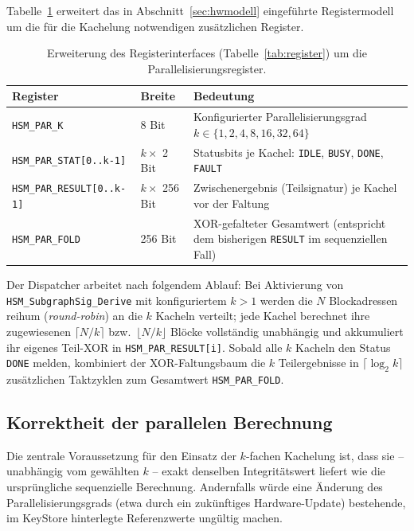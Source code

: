 ﻿\documentclass[a4paper,12pt]{article}
\theoremstyle{definition}
\begin{document}
Tabelle~\ref{tab:par-register} erweitert das in Abschnitt~\ref{sec:hwmodell} eingeführte Registermodell um die für die Kachelung notwendigen zusätzlichen Register.

\begin{table}[h]
	\centering
	\small
	\begin{tabular}{@{}lp{2.6cm}p{8.2cm}@{}}
		\toprule
		Register & Breite & Bedeutung \\
		\midrule
		\texttt{HSM\_PAR\_K} & 8 Bit & Konfigurierter Parallelisierungsgrad $k \in \{1,2,4,8,16,32,64\}$ \\
		\texttt{HSM\_PAR\_STAT[0..k-1]} & $k \times$ 2 Bit & Statusbits je Kachel: \texttt{IDLE}, \texttt{BUSY}, \texttt{DONE}, \texttt{FAULT} \\
		\texttt{HSM\_PAR\_RESULT[0..k-1]} & $k \times$ 256 Bit & Zwischenergebnis (Teilsignatur) je Kachel vor der Faltung \\
		\texttt{HSM\_PAR\_FOLD} & 256 Bit & XOR-gefalteter Gesamtwert (entspricht dem bisherigen \texttt{RESULT} im sequenziellen Fall) \\
		\bottomrule
	\end{tabular}
	\caption{Erweiterung des Registerinterfaces (Tabelle~\ref{tab:register}) um die Parallelisierungsregister.}
	\label{tab:par-register}
\end{table}

Der Dispatcher arbeitet nach folgendem Ablauf: Bei Aktivierung von \texttt{HSM\_SubgraphSig\_Derive} mit konfiguriertem $k > 1$ werden die $N$ Blockadressen reihum (\emph{round-robin}) an die $k$ Kacheln verteilt; jede Kachel berechnet ihre zugewiesenen $\lceil N/k \rceil$ bzw.\ $\lfloor N/k \rfloor$ Blöcke vollständig unabhängig und akkumuliert ihr eigenes Teil-XOR in \texttt{HSM\_PAR\_RESULT[i]}. Sobald alle $k$ Kacheln den Status \texttt{DONE} melden, kombiniert der XOR-Faltungsbaum die $k$ Teilergebnisse in $\lceil \log_2 k \rceil$ zusätzlichen Taktzyklen zum Gesamtwert \texttt{HSM\_PAR\_FOLD}.

\subsection{Korrektheit der parallelen Berechnung}
\label{subsec:par-korrektheit}

Die zentrale Voraussetzung für den Einsatz der $k$-fachen Kachelung ist, dass sie -- unabhängig vom gewählten $k$ -- exakt denselben Integritätswert liefert wie die ursprüngliche sequenzielle Berechnung. Andernfalls würde eine Änderung des Parallelisierungsgrads (etwa durch ein zukünftiges Hardware-Update) bestehende, im KeyStore hinterlegte Referenzwerte ungültig machen.
\end{document}
